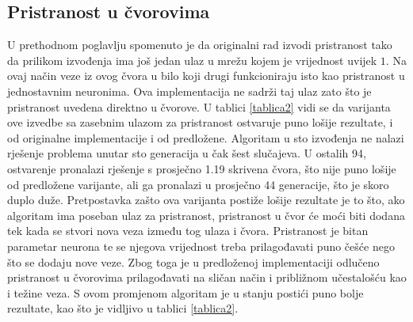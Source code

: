 \documentclass[times, utf8, diplomski, numeric]{fer}
\begin{document}
\subsection{Pristranost u čvorovima}
U prethodnom poglavlju spomenuto je da originalni rad izvodi pristranost tako da prilikom izvođenja ima još jedan ulaz u mrežu kojem je vrijednost uvijek $1$. Na ovaj način veze iz ovog čvora u bilo koji drugi funkcioniraju isto kao pristranost u jednostavnim neuronima. Ova implementacija ne sadrži taj ulaz zato što je pristranost uvedena direktno u čvorove. U tablici \ref{tablica2} vidi se da varijanta ove izvedbe sa zasebnim ulazom za pristranost ostvaruje puno lošije rezultate, i od originalne implementacije i od predložene. Algoritam u sto izvođenja ne nalazi rješenje problema unutar sto generacija u čak šest slučajeva. U ostalih 94, ostvarenje pronalazi rješenje s prosječno 1.19 skrivena čvora, što nije puno lošije od predložene varijante, ali ga pronalazi u prosječno 44 generacije, što je skoro duplo duže. Pretpostavka zašto ova varijanta postiže lošije rezultate je to što, ako algoritam ima poseban ulaz za pristranost, pristranost u čvor će moći biti dodana tek kada se stvori nova veza između tog ulaza i čvora. Pristranost je bitan parametar neurona te se njegova vrijednost treba prilagođavati puno češće nego što se dodaju nove veze. Zbog toga je u predloženoj implementaciji odlučeno pristranost u čvorovima prilagođavati na sličan način i približnom učestalošću kao i težine veza. S ovom promjenom algoritam je u stanju postići puno bolje rezultate, kao što je vidljivo u tablici \ref{tablica2}.
\end{document}
